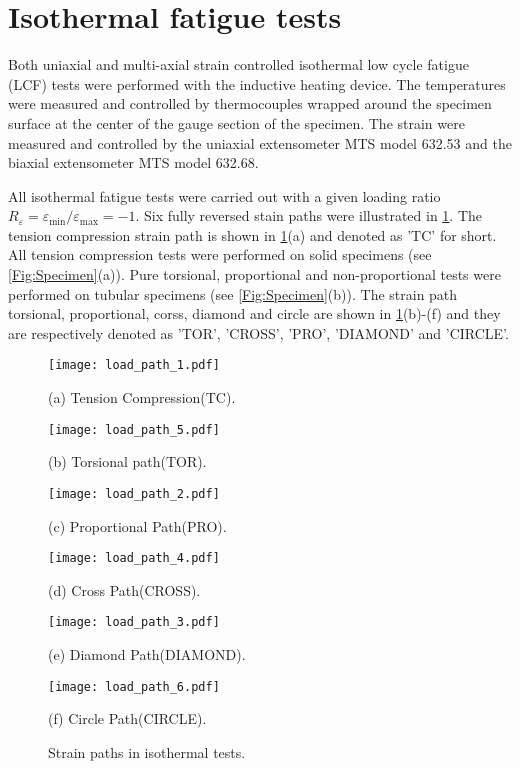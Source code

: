 \section{Isothermal fatigue tests}
\noindent Both uniaxial and multi-axial strain controlled isothermal low cycle fatigue (LCF) tests were performed with the inductive heating device.
The temperatures were measured and controlled by thermocouples wrapped around the specimen surface at the center of the gauge section of the specimen.
The strain were measured and controlled by the uniaxial extensometer MTS model 632.53 and the biaxial extensometer MTS model 632.68.

All isothermal fatigue tests were carried out with a given loading ratio $R_{\varepsilon}=\varepsilon_{\min}/\varepsilon_{\max}=-1$.
Six fully reversed stain paths were illustrated in \ref{Fig:LoadPath}.
The tension compression strain path is shown in \ref{Fig:LoadPath}(a) and denoted as 'TC' for short.
All tension compression tests were performed on solid specimens (see \ref{Fig:Specimen}(a)).
Pure torsional, proportional and non-proportional tests were performed on tubular specimens (see \ref{Fig:Specimen}(b)).
The strain path torsional, proportional, corss, diamond and circle are shown in \ref{Fig:LoadPath}(b)-(f) and they are respectively denoted as 'TOR', 'CROSS', 'PRO', 'DIAMOND' and 'CIRCLE'.

\begin{figure}
  \begin{minipage}[t]{0.5\linewidth}
  \nonumber
    \centering
    \texttt{[image: load\_path\_1.pdf]}
    \centerline{\small (a) Tension Compression(TC).}
  \end{minipage}%
  \begin{minipage}[t]{0.5\linewidth}
    \centering
    \texttt{[image: load\_path\_5.pdf]}
    \centerline{\small (b) Torsional path(TOR).}
  \end{minipage}
  \begin{minipage}[t]{0.5\linewidth}
  \nonumber
    \centering
    \texttt{[image: load\_path\_2.pdf]}
    \centerline{\small (c) Proportional Path(PRO).}
  \end{minipage}%
  \begin{minipage}[t]{0.5\linewidth}
    \centering
    \texttt{[image: load\_path\_4.pdf]}
    \centerline{\small (d) Cross Path(CROSS).}
  \end{minipage}
  \begin{minipage}[t]{0.5\linewidth}
  \nonumber
    \centering
    \texttt{[image: load\_path\_3.pdf]}
    \centerline{\small (e) Diamond Path(DIAMOND).}
  \end{minipage}%
  \begin{minipage}[t]{0.5\linewidth}
    \centering
    \texttt{[image: load\_path\_6.pdf]}
    \centerline{\small (f) Circle Path(CIRCLE).}
  \end{minipage}
  \caption{Strain paths in isothermal tests.}
  \label{Fig:LoadPath}
\end{figure}

